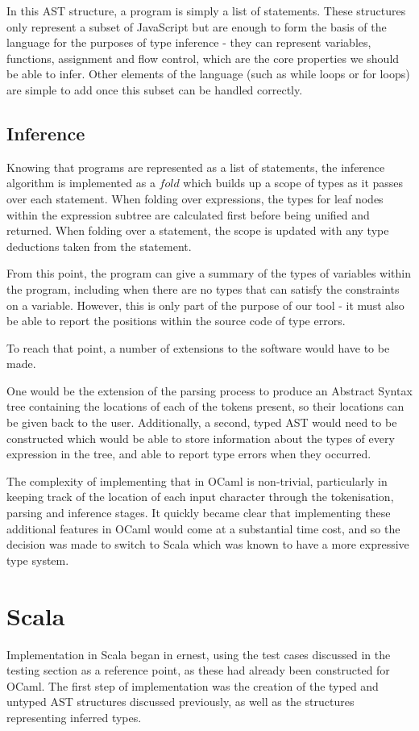 \documentclass[british, twoside, openright]{bhamthesis}
\theoremstyle{definition}
\begin{document}
      In this AST structure, a program is simply a list of statements. These structures only represent a subset of JavaScript but are enough to form the basis of the language for the purposes of type inference - they can represent variables, functions, assignment and flow control, which are the core properties we should be able to infer. Other elements of the language (such as while loops or for loops) are simple to add once this subset can be handled correctly.

    \subsection{Inference}
      Knowing that programs are represented as a list of statements, the inference algorithm is implemented as a $fold$ which builds up a scope of types as it passes over each statement. When folding over expressions, the types for leaf nodes within the expression subtree are calculated first before being unified and returned. When folding over a statement, the scope is updated with any type deductions taken from the statement.

      From this point, the program can give a summary of the types of variables within the program, including when there are no types that can satisfy the constraints on a variable. However, this is only part of the purpose of our tool - it must also be able to report the positions within the source code of type errors.

      To reach that point, a number of extensions to the software would have to be made.

      One would be the extension of the parsing process to produce an Abstract Syntax tree containing the locations of each of the tokens present, so their locations can be given back to the user. Additionally, a second, typed AST would need to be constructed which would be able to store information about the types of every expression in the tree, and able to report type errors when they occurred.

      The complexity of implementing that in OCaml is non-trivial, particularly in keeping track of the location of each input character through the tokenisation, parsing and inference stages. It quickly became clear that implementing these additional features in OCaml would come at a substantial time cost, and so the decision was made to switch to Scala which was known to have a more expressive type system.

  \section{Scala}
    Implementation in Scala began in ernest, using the test cases discussed in the testing section as a reference point, as these had already been constructed for OCaml. The first step of implementation was the creation of the typed and untyped AST structures discussed previously, as well as the structures representing inferred types.
\end{document}

